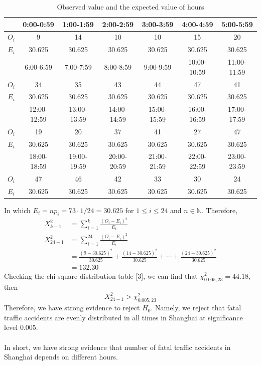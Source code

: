 \documentclass[a4paper,12pt]{article}
\begin{document}
\begin{table}[H]\centering
\begin{tabular}{|c|c|c|c|c|c|c|}
\hline
&0:00-0:59&1:00-1:59&2:00-2:59&3:00-3:59&4:00-4:59&5:00-5:59\\ \hline
$O_i$&9&14&10&10&15&20\\ \hline
$E_i$&30.625&30.625&30.625&30.625&30.625&30.625\\ \hline\hline
&6:00-6:59&7:00-7:59&8:00-8:59&9:00-9:59&10:00-10:59&11:00-11:59\\ \hline
$O_i$&34&35&43&44&47&41\\ \hline
$E_i$&30.625&30.625&30.625&30.625&30.625&30.625\\ \hline\hline
&12:00-12:59 &13:00-13:59&14:00-14:59&15:00-15:59&16:00-16:59&17:00-17:59\\ \hline
$O_i$&19&20&37&41&27&47\\ \hline
$E_i$&30.625&30.625&30.625&30.625&30.625&30.625\\ \hline
\hline
&18:00-18:59 &19:00-19:59&20:00-20:59&21:00-21:59&22:00-22:59&23:00-23:59\\ \hline
$O_i$&47&46&42&33&30&24\\ \hline
$E_i$&30.625&30.625&30.625&30.625&30.625&30.625\\ \hline
\end{tabular}
\caption{Observed value and the expected value of  hours}\label{table:area_OE}
\end{table}
\noindent In which $E_i=np_i=73\cdot1/24=30.625$ for $1\leq i\leq 24$ and $n\in\mathbb{N}$. Therefore,
\begin{equation}\label{hourp}
\begin{split}
X_{k-1}^{2}&=\sum_{i=1}^{k} \frac{\left(O_{i}-E_{i}\right)^{2}}{E_{i}}\\
X_{24-1}^{2}&=\sum_{i=1}^{24} \frac{\left(O_{i}-E_{i}\right)^{2}}{E_{i}}\\
&=\frac{(9-30.625)^{2}}{30.625}+\frac{(14-30.625)^{2}}{30.625}
+\cdots+\frac{(24-30.625)^{2}}{30.625}
\\&=132.30
\end{split}
\end{equation}
Checking the chi-square distribution table [3], we can find that $\chi_{0.005,23}^{2}=44.18$, then
$$X_{24-1}^{2}>\chi_{0.005,23}^{2}$$
Therefore, we have strong evidence to reject $H_0$. Namely, we reject that fatal traffic accidents are evenly distributed in all times in Shanghai at significance level 0.005.\\\\
In short, we have strong evidence that number of fatal traffic accidents in Shanghai depends on different hours.
\end{document}
